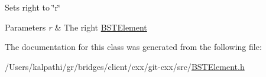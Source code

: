 Sets right to \char`\"{}r\char`\"{}


\begin{DoxyParams}{Parameters}
{\em r} & The right \hyperlink{classbridges_1_1_b_s_t_element}{B\+S\+T\+Element} \\
\hline
\end{DoxyParams}


The documentation for this class was generated from the following file\+:\begin{DoxyCompactItemize}
\item 
/\+Users/kalpathi/gr/bridges/client/cxx/git-\/cxx/src/\hyperlink{_b_s_t_element_8h}{B\+S\+T\+Element.\+h}\end{DoxyCompactItemize}
